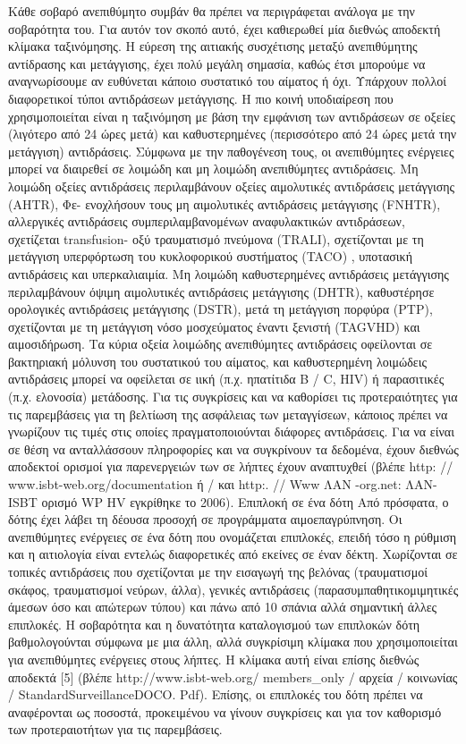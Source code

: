  	Κάθε σοβαρό ανεπιθύμητο συμβάν θα πρέπει να περιγράφεται ανάλογα με την σοβαρότητα του. Για αυτόν τον σκοπό αυτό, έχει καθιερωθεί μία διεθνώς αποδεκτή κλίμακα ταξινόμησης. Η εύρεση της αιτιακής συσχέτισης μεταξύ ανεπιθύμητης αντίδρασης και μετάγγισης, έχει πολύ μεγάλη σημασία, καθώς έτσι μπορούμε να αναγνωρίσουμε αν ευθύνεται κάποιο συστατικό του αίματος ή όχι. Υπάρχουν πολλοί διαφορετικοί τύποι αντιδράσεων μετάγγισης. Η πιο κοινή υποδιαίρεση που χρησιμοποιείται είναι η ταξινόμηση με βάση την εμφάνιση των αντιδράσεων σε οξείες (λιγότερο από 24 ώρες μετά) και καθυστερημένες (περισσότερο από 24 ώρες μετά την μετάγγιση) αντιδράσεις.
 	 Σύμφωνα με την παθογένεση τους, οι ανεπιθύμητες ενέργειες μπορεί να διαιρεθεί σε λοιμώδη και μη λοιμώδη ανεπιθύμητες αντιδράσεις. Μη λοιμώδη οξείες αντιδράσεις περιλαμβάνουν οξείες αιμολυτικές αντιδράσεις μετάγγισης (AHTR), Φε- ενοχλήσουν τους μη αιμολυτικές αντιδράσεις μετάγγισης (FNHTR), αλλεργικές αντιδράσεις συμπεριλαμβανομένων αναφυλακτικών αντιδράσεων, σχετίζεται transfusion- οξύ τραυματισμό πνεύμονα (TRALI), σχετίζονται με τη μετάγγιση υπερφόρτωση του κυκλοφορικού συστήματος (TACO) , υποτασική αντιδράσεις και υπερκαλιαιμία. Μη λοιμώδη καθυστερημένες αντιδράσεις μετάγγισης περιλαμβάνουν όψιμη αιμολυτικές αντιδράσεις μετάγγισης (DHTR), καθυστέρησε ορολογικές αντιδράσεις μετάγγισης (DSTR), μετά τη μετάγγιση πορφύρα (PTP), σχετίζονται με τη μετάγγιση νόσο μοσχεύματος έναντι ξενιστή (TAGVHD) και αιμοσιδήρωση.
Τα κύρια οξεία λοιμώδης ανεπιθύμητες αντιδράσεις οφείλονται σε βακτηριακή μόλυνση του συστατικού του αίματος, και καθυστερημένη λοιμώδεις αντιδράσεις μπορεί να οφείλεται σε ιική (π.χ. ηπατίτιδα B / C, HIV) ή παρασιτικές (π.χ. ελονοσία) μετάδοσης.
Για τις συγκρίσεις και να καθορίσει τις προτεραιότητες για τις παρεμβάσεις για τη βελτίωση της ασφάλειας των μεταγγίσεων, κάποιος πρέπει να γνωρίζουν τις τιμές στις οποίες πραγματοποιούνται διάφορες αντιδράσεις.
Για να είναι σε θέση να ανταλλάσσουν πληροφορίες και να συγκρίνουν τα δεδομένα, έχουν διεθνώς αποδεκτοί ορισμοί για παρενεργειών των σε λήπτες έχουν αναπτυχθεί (βλέπε http: // www.isbt-web.org/documentation ή / και http:. // Www ΛΑΝ -org.net: ΛΑΝ-ISBT ορισμό WP HV εγκρίθηκε το 2006).
Επιπλοκή σε ένα δότη
Από πρόσφατα, ο δότης έχει λάβει τη δέουσα προσοχή σε προγράμματα αιμοεπαγρύπνηση. Οι ανεπιθύμητες ενέργειες σε ένα δότη που ονομάζεται επιπλοκές, επειδή τόσο η ρύθμιση και η αιτιολογία είναι εντελώς διαφορετικές από εκείνες σε έναν δέκτη. Χωρίζονται σε τοπικές αντιδράσεις που σχετίζονται με την εισαγωγή της βελόνας (τραυματισμοί σκάφος, τραυματισμοί νεύρων, άλλα), γενικές αντιδράσεις (παρασυμπαθητικομιμητικές άμεσων όσο και απώτερων τύπου) και πάνω από 10 σπάνια αλλά σημαντική άλλες επιπλοκές. Η σοβαρότητα και η δυνατότητα καταλογισμού των επιπλοκών δότη βαθμολογούνται σύμφωνα με μια άλλη, αλλά συγκρίσιμη κλίμακα που χρησιμοποιείται για ανεπιθύμητες ενέργειες στους λήπτες. Η κλίμακα αυτή είναι επίσης διεθνώς αποδεκτά [5] (βλέπε http://www.isbt-web.org/ members_only / αρχεία / κοινωνίας / StandardSurveillanceDOCO. Pdf). Επίσης, οι επιπλοκές του δότη πρέπει να αναφέρονται ως ποσοστά, προκειμένου να γίνουν συγκρίσεις και για τον καθορισμό των προτεραιοτήτων για τις παρεμβάσεις.	 
